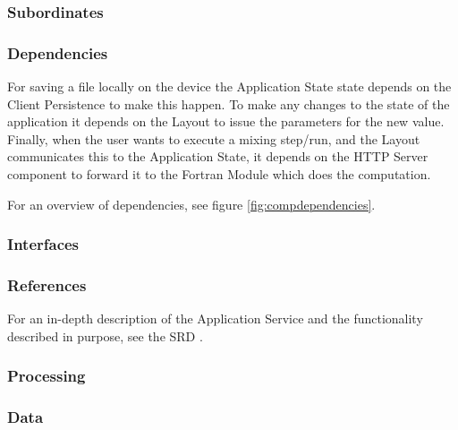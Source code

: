 \subsubsection*{Subordinates}

\subsubsection*{Dependencies}
For saving a file locally on the device the Application State state depends on the Client Persistence to make this happen. To make any changes to the state of the application it depends on the Layout to issue the parameters for the new value. Finally, when the user wants to execute a mixing step/run, and the Layout communicates this to the Application State, it depends on the HTTP Server component to forward it to the Fortran Module which does the computation.

\fpstartparagraph{} For an overview of dependencies, see figure \ref{fig:compdependencies}.

\subsubsection*{Interfaces}

\subsubsection*{References}
For an in-depth description of the Application Service and the functionality described in purpose, see the SRD \cite{srd}.

\subsubsection*{Processing}

\subsubsection*{Data}
